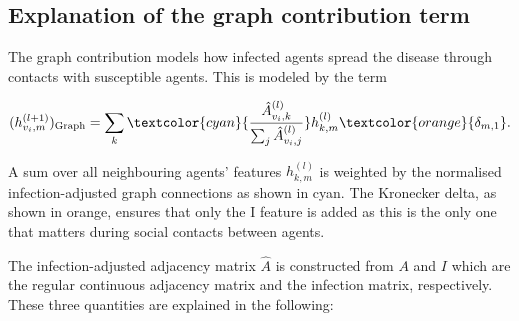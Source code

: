 \subsection{Explanation of the graph contribution term}

The graph contribution models how infected agents spread the disease through contacts with susceptible agents. This is modeled by the term

\begin{equation}
	(h_{v_i, m}^{(l+1)})_{\text{Graph}} = 
	\sum_k \textcolor{cyan}{\frac{\hat{A}_{v_i, k}^{(l)}}{\sum_j \hat{A}_{v_i, j}^{(l)}}} h_{k, m}^{(l)} \textcolor{orange}{\delta_{m, 1}}.
\end{equation}

A sum over all neighbouring agents' features $h_{k,m}^{(l)}$ is weighted by the normalised infection-adjusted graph connections as shown in cyan. The Kronecker delta, as shown in orange, ensures that only the I feature is added as this is the only one that matters during social contacts between agents.

The infection-adjusted adjacency matrix $\hat{A}$ is constructed from $A$ and $I$ which are the regular continuous adjacency matrix and the infection matrix, respectively. These three quantities are explained in the following:
	
